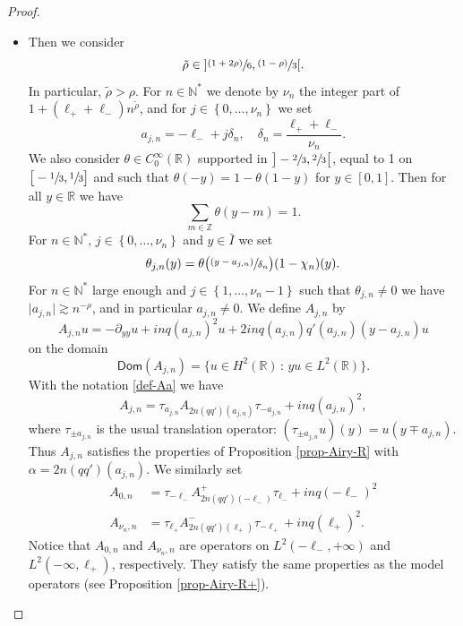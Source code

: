 \documentclass[11pt]{article}
\numberwithin{equation}{section}
\newcommand{\psfrac}[2]{\sfrac{(#1)}{#2}}
\theoremstyle{plain}
\theoremstyle{definition}
\newcommand{\abs}[1]{\vert #1\vert}
\newcommand{\set}[1]{\{ #1\}}
\newcommand{\Ii}[2] {\left\{ #1,\dots,#2 \right\}}
\newcommand{\1}{\mathds 1}
\newcommand{\st}{\,:\,}
\newcommand{\Dom}{\mathsf{Dom}}
\newcommand{\R}{\mathbb{R}}
\newcommand{\N}{\mathbb{N}}
\newcommand{\Z}{\mathbb{Z}}
\let\a\alpha
\let\d\delta
\let\th\theta
\begin{document}
\begin{proof}
\begin{itemize}
\item
Then we consider
\[
\tilde \rho \in {}] \psfrac {1+2\rho} 6, \psfrac {1-\rho} 3[.
\]
In particular, $\tilde \rho > \rho$. For $n \in \N^*$ we denote by $\nu_n$ the integer part of $1+ (\ell_+ + \ell_-) n^{\tilde \rho}$, and for $j \in \Ii 0 {\nu_n}$ we set
\[
a_{j,n} = -\ell_- + j \d_n, \quad \d_n = \frac {\ell_+ + \ell_-}{\nu_n}.
\]
We also consider $\theta \in C_0^\infty(\R)$ supported in $\big]-\sfrac 23,\sfrac 23\big[$, equal to 1 on $\big[-\sfrac 13,\sfrac 13\big]$ and such that $\th(-y) = 1-\th(1-y)$ for $y \in [0,1]$. Then for all $y \in \R$ we have
\[
\sum_{m \in \Z} \theta(y-m) = 1.
\]
For $n \in \N^*$, $j \in \Ii 0 {\nu_n}$ and $y \in \bar I$ we set
\[
\theta_{j,n}(y) = \theta \bigl(\psfrac {y-a_{j,n}}{\d_n} \bigr) (1-\chi_n)(y).
\]
For $n \in \N^*$ large enough and $j \in \Ii 1 {\nu_n-1}$ such that $\th_{j,n} \neq 0$ we have \hbox{$\abs{a_{j,n}} \gtrsim n^{-\rho}$}, and in particular $a_{j,n}\neq 0$. We define $A_{j,n}$ by
\[
A_{j,n} u = -\partial_{yy} u + in q(a_{j,n})^2 u + 2 i n q(a_{j,n}) q'(a_{j,n}) (y-a_{j,n}) u
\]
on the domain
\[
\Dom(A_{j,n}) = \set{u \in H^2(\R) \st y u \in L^2(\R)}.
\]
With the notation \eqref{def-Aa} we have
\[
A_{j,n} = \tau_{a_{j,n}} A_{2n(qq')(a_{j,n})} \tau_{-a_{j,n}} + i n q(a_{j,n})^2,
\]
where $\tau_{\pm a_{j,n}}$ is the usual translation operator: $(\tau_{\pm a_{j,n}} u)(y) = u(y \mp a_{j,n})$. Thus $A_{j,n}$ satisfies the properties of Proposition \ref{prop-Airy-R} with $\a = 2n (qq')(a_{j,n})$. We similarly set
\begin{align*}
A_{0,n} &= \tau_{-\ell_-} A_{2n(qq')(-\ell_-)}^+ \tau_{\ell_-} + i n q(-\ell_-)^2
\\
\tag*{and}
A_{\nu_n,n} &= \tau_{\ell_+} A_{2n(qq')(\ell_+)}^- \tau_{-\ell_+} + i n q(\ell_+)^2.
\end{align*}
Notice that $A_{0,n}$ and $A_{\nu_n,n}$ are operators on $L^2(-\ell_-,+\infty)$ and $L^2(-\infty,\ell_+)$, respectively. They satisfy the same properties as the model operators (see Proposition \ref{prop-Airy-R+}).


\end{itemize}
\end{proof}
\end{document}
